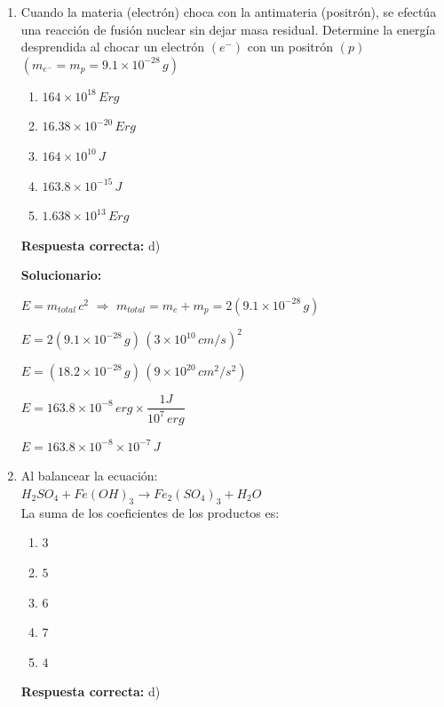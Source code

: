 \begin{enumerate}[resume]

\item Cuando la materia (electrón) choca con la antimateria (positrón), se efectúa una reacción de fusión nuclear sin dejar masa residual. Determine la energía desprendida al chocar un electrón $(e^-)$ con un positrón $(p)$ \\
$(m_{e^-}=m_{p}=9.1\times10^{-28}\,g)$

\begin{enumerate}[label=\alph*)]
	\item $164\times10^{18}\,Erg$
	\item $16.38\times10^{-20}\,Erg$
	\item $164\times10^{10}\,J$
	\item $163.8\times10^{-15}\,J$
	\item $1.638\times10^{13}\,Erg$
\end{enumerate}

\textbf{Respuesta correcta:} d)

\vspace{2mm}
\textbf{Solucionario:}

$E=m_{total}\,c^{2}$ $\Longrightarrow$ $m_{total}=m_{e}+m_{p}=2(9.1\times10^{-28}\,g)$

$E=2(9.1\times10^{-28}\,g)\,(3\times10^{10}\,cm/s)^{2}$

$E=(18.2\times10^{-28}\,g)\,(9\times10^{20}\,cm^{2}/s^{2})$

$E=163.8\times10^{-8}\,erg \times \dfrac{1J}{10^{7}\,erg}$

$E=163.8\times10^{-8}\times10^{-7}\,J$



\item Al balancear la ecuación: \\
$H_{2}SO_{4}+Fe(OH)_{3}\rightarrow Fe_{2}(SO_{4})_{3}+H_{2}O$\\
La suma de los coeficientes de los productos es:

\begin{enumerate}[label=\alph*)]
	\item $3$
	\item $5$
	\item $6$
	\item $7$
	\item $4$
\end{enumerate}

\textbf{Respuesta correcta:} d)


\end{enumerate}

